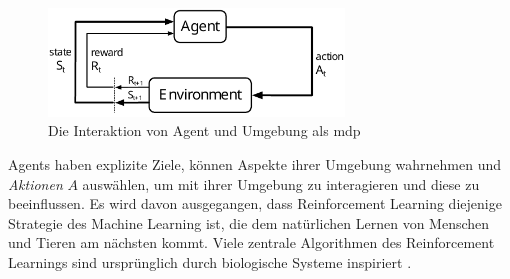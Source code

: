 \begin{figure}
    \centering
    \includegraphics[width = 0.7\textwidth]{Bilder/MDP.pdf}
    \caption{Die Interaktion von Agent und Umgebung als \ac{mdp} \cite[48]{sutton2018rlintro}}
    \label{fig:mdp}
\end{figure}

Agents haben explizite Ziele, können Aspekte ihrer Umgebung wahrnehmen und \emph{Aktionen} $A$ auswählen, um mit ihrer Umgebung zu interagieren und diese zu beeinflussen.
Es wird davon ausgegangen, dass Reinforcement Learning diejenige Strategie des Machine Learning ist, die dem natürlichen Lernen von Menschen und Tieren am nächsten kommt.
Viele zentrale Algorithmen des Reinforcement Learnings sind ursprünglich durch biologische Systeme inspiriert \cite[4]{sutton2018rlintro}.

